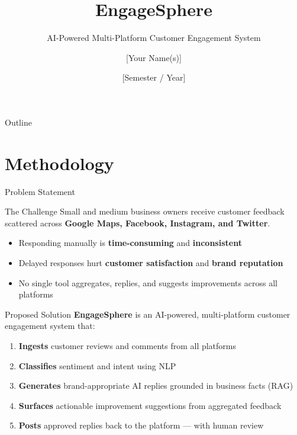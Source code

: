 \documentclass[aspectratio=169]{beamer}
\title[EngageSphere]{\textbf{EngageSphere}}
\subtitle{AI-Powered Multi-Platform Customer Engagement System}
\author{[Your Name(s)]}
\institute{[Your College / University]}
\date{[Semester / Year]}
\begin{document}

\begin{frame}
  \titlepage
\end{frame}

\begin{frame}{Outline}
  \tableofcontents
\end{frame}

\section{Methodology}

\begin{frame}{Problem Statement}
  \begin{block}{The Challenge}
    Small and medium business owners receive customer feedback scattered across
    \textbf{Google Maps, Facebook, Instagram, and Twitter}.
  \end{block}
  \vspace{0.4cm}
  \begin{itemize}
    \item Responding manually is \textbf{time-consuming} and \textbf{inconsistent}
    \item Delayed responses hurt \textbf{customer satisfaction} and \textbf{brand reputation}
    \item No single tool aggregates, replies, and suggests improvements across all platforms
  \end{itemize}
\end{frame}

\begin{frame}{Proposed Solution}
  \textbf{EngageSphere} is an AI-powered, multi-platform customer engagement system that:
  \vspace{0.3cm}
  \begin{enumerate}
    \item \textbf{Ingests} customer reviews and comments from all platforms
    \item \textbf{Classifies} sentiment and intent using NLP
    \item \textbf{Generates} brand-appropriate AI replies grounded in business facts (RAG)
    \item \textbf{Surfaces} actionable improvement suggestions from aggregated feedback
    \item \textbf{Posts} approved replies back to the platform — with human review
  \end{enumerate}
\end{frame}
\end{document}
